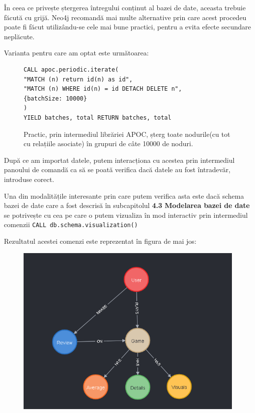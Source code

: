 \documentclass[12pt,a4paper]{report}
\begin{document}
În ceea ce privește ștergerea întregului conținut al bazei de date, aceasta trebuie făcută cu grijă. Neo4j recomandă mai multe alternative prin care acest procedeu poate fi făcut utilizându-se cele mai bune practici, pentru a evita efecte secundare neplăcute. \cite{19}

Varianta pentru care am optat este următoarea:

\begin{figure}[H]
\centering
\begin{BVerbatim}
CALL apoc.periodic.iterate(
"MATCH (n) return id(n) as id",
"MATCH (n) WHERE id(n) = id DETACH DELETE n", 
{batchSize: 10000}
)
YIELD batches, total RETURN batches, total
\end{BVerbatim}
\caption*{Practic, prin intermediul librăriei APOC, șterg toate nodurile(cu tot cu relațiile asociate) în grupuri de câte 10000 de noduri.}
\end{figure}

După ce am importat datele, putem interacționa cu acestea prin intermediul panoului de comandă ca să se poată verifica dacă datele au fost întradevăr, introduse corect.

Una din modalitățile interesante prin care putem verifica asta este dacă schema bazei de date care a fost descrisă în subcapitolul \textbf{4.3 Modelarea bazei de date } se potrivește cu cea pe care o putem vizualiza în mod interactiv prin intermediul comenzii \texttt{CALL db.schema.visualization()}

Rezultatul acestei comenzi este reprezentat în figura de mai jos:

\begin{figure}[H]
\centering
\caption{}
\includegraphics[scale = 0.7]{exemplu_16_schema}
\caption*{}
\end{figure}
\end{document}
